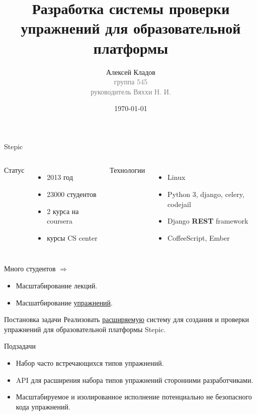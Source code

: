 \documentclass{beamer}
\title[Упражнения в Stepic]{Разработка системы проверки упражнений для
  образовательной платформы}
\author{Алексей Кладов\\
  { \footnotesize \textcolor{gray}{группа 545\\ руководитель Вяххи Н. И.}}}
\institute[СПбГУ]{Санкт-Петербургский государственный университет}
\date{\today} %
\begin{document}
\begin{frame}
\titlepage %
\end{frame}

\begin{frame}{Stepic}
  \begin{columns}[t]
    Статус
    \begin{itemize}
    \item 2013 год
    \item 23000 студентов
    \item 2 курса на coursera
    \item курсы CS center
    \end{itemize}

    Технологии
    \begin{itemize}
    \item Linux
    \item Python 3, django, celery, codejail
    \item Django \textbf{REST} framework
    \item CoffeeScript, Ember
    \end{itemize}
  \end{columns}

  \medskip

  Много студентов $\Rightarrow$
  \begin{itemize}
  \item Масштабирование лекций.
  \item Масшатбирование \underline{упражнений}.
  \end{itemize}
\end{frame}

\begin{frame}{Постановка задачи}
  Реализовать \underline{расширяемую} систему для создания и проверки упражнений
  для образовательной платформы Stepic.

  \medskip

  Подзадачи
  \begin{itemize}
  \item Набор часто встречающихся типов упражнений.
  \item API для расширения набора типов упражнений
    сторонними разработчиками.
  \item Масштабируемое и изолированное исполнение потенциально не
    безопасного кода упражнений.
  \end{itemize}
\end{frame}
\end{document}
